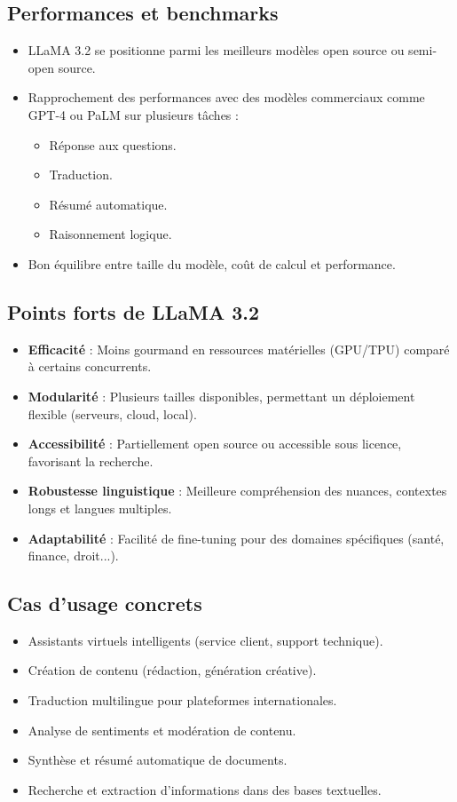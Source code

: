 \subsection{Performances et benchmarks}
\begin{itemize}
    \item LLaMA 3.2 se positionne parmi les meilleurs modèles open source ou semi-open source.
    \item Rapprochement des performances avec des modèles commerciaux comme GPT-4 ou PaLM sur plusieurs tâches :
    \begin{itemize}
        \item Réponse aux questions.
        \item Traduction.
        \item Résumé automatique.
        \item Raisonnement logique.
    \end{itemize}
    \item Bon équilibre entre taille du modèle, coût de calcul et performance.
\end{itemize}

\subsection{Points forts de LLaMA 3.2}
\begin{itemize}
    \item \textbf{Efficacité} : Moins gourmand en ressources matérielles (GPU/TPU) comparé à certains concurrents.
    \item \textbf{Modularité} : Plusieurs tailles disponibles, permettant un déploiement flexible (serveurs, cloud, local).
    \item \textbf{Accessibilité} : Partiellement open source ou accessible sous licence, favorisant la recherche.
    \item \textbf{Robustesse linguistique} : Meilleure compréhension des nuances, contextes longs et langues multiples.
    \item \textbf{Adaptabilité} : Facilité de fine-tuning pour des domaines spécifiques (santé, finance, droit...).
\end{itemize}

\subsection{Cas d’usage concrets}
\begin{itemize}
    \item Assistants virtuels intelligents (service client, support technique).
    \item Création de contenu (rédaction, génération créative).
    \item Traduction multilingue pour plateformes internationales.
    \item Analyse de sentiments et modération de contenu.
    \item Synthèse et résumé automatique de documents.
    \item Recherche et extraction d’informations dans des bases textuelles.
\end{itemize}

